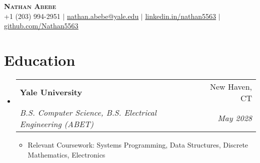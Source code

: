\documentclass[letterpaper,11pt]{article}
\makeatletter
\newcommand{\resumeItem}[1]{
  \item\small{
    {#1 \vspace{-2pt}}
  }
}
\newcommand{\resumeSubheading}[4]{
  \vspace{-2pt}\item
    \begin{tabular*}{0.97\textwidth}[t]{l@{\extracolsep{\fill}}r}
      \textbf{#1} & #2 \\
      \textit{\small#3} & \textit{\small #4} \\
    \end{tabular*}\vspace{-7pt}
}
\newcommand{\resumeSubHeadingListStart}{\begin{itemize}[leftmargin=0.15in, label={}]}
\newcommand{\resumeSubHeadingListEnd}{\end{itemize}}
\newcommand{\resumeItemListStart}{\begin{itemize}}
\newcommand{\resumeItemListEnd}{\end{itemize}\vspace{-5pt}}
\makeatother
\begin{document}
\begin{center}
    \textbf{\Huge \scshape Nathan Abebe} \\ \vspace{1pt}
    \small +1 (203) 994-2951 $|$ \href{mailto:nathan.abebe@yale.edu}{\underline{nathan.abebe@yale.edu}} $|$ 
    \href{https://linkedin.in/nathan5563}{\underline{linkedin.in/nathan5563}} $|$
    \href{https://github.com/Nathan5563}{\underline{github.com/Nathan5563}}
\end{center}


\section{Education}
  \resumeSubHeadingListStart
    \resumeSubheading
      {Yale University}{New Haven, CT}
      {B.S. Computer Science, B.S. Electrical Engineering (ABET)}{May 2028}
      \resumeItemListStart
        \resumeItem{Relevant Coursework: Systems Programming, Data Structures, Discrete Mathematics, Electronics}
      \resumeItemListEnd
  \resumeSubHeadingListEnd


\end{document}
